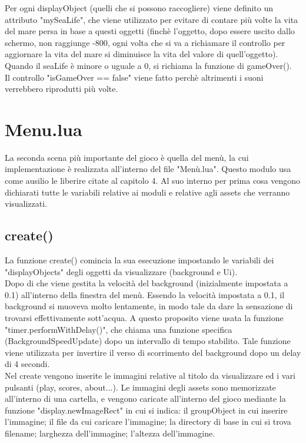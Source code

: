 \documentclass[12pt]{article}
\begin{document}
Per ogni displayObject (quelli che si possono raccogliere) viene definito un attributo "mySeaLife", che viene utilizzato per evitare di contare più volte la vita del mare persa in base a questi oggetti (finchè l'oggetto, dopo essere uscito dallo schermo, non raggiunge -800, ogni volta che si va a richiamare il controllo per aggiornare la vita del mare si diminuisce la vita del valore di quell'oggetto). Quando il seaLife è minore o uguale a 0, si richiama la funzione di gameOver().\\

Il controllo "isGameOver == false" viene fatto perchè altrimenti i suoni verrebbero riprodutti più volte. 




\section{Menu.lua}
La seconda scena più importante del gioco è quella del menù, la cui implementazione è realizzata all'interno del file "Menù.lua". Questo modulo usa come ausilio le liberire citate al capitolo 4. Al suo interno per prima cosa vengono dichiarati tutte le variabili relative ai moduli e relative agli assets che verranno visualizzati.

\subsection{create()}
La funzione create() comincia la sua esecuzione impostando le variabili dei "displayObjects" degli oggetti da visualizzare (background e Ui). 
\\

Dopo di che viene gestita la velocità del background (inizialmente impostata a 0.1) all'interno della finestra del menù. Essendo la velocità impostata a 0.1, il background si muoveva molto lentamente, in modo tale da dare la sensazione di trovarsi effettivamente sott'acqua. A questo proposito viene usata la funzione "timer.performWithDelay()", che chiama una funzione specifica (BackgroundSpeedUpdate) dopo un intervallo di tempo stabilito. Tale funzione viene utilizzata per invertire il verso di scorrimento del background dopo un delay di 4 secondi. 
\\

Nel create vengono inserite le immagini relative al titolo da visualizzare ed i vari pulsanti (play, scores, about...). Le immagini 
degli assets sono memorizzate all'interno di una cartella, e vengono caricate all'interno del gioco mediante la funzione "display.newImageRect" in cui si indica: il groupObject in cui inserire l'immagine; il file da cui caricare l'immagine; la directory di base in cui si trova filename; larghezza dell'immagine; l'altezza dell'immagine. 
\\
\end{document}
